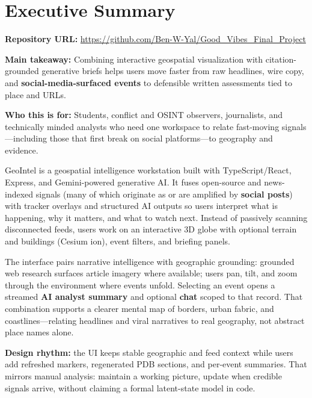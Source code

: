 \section*{Executive Summary}

\textbf{Repository URL:} \url{https://github.com/Ben-W-Yal/Good_Vibes_Final_Project}

\textbf{Main takeaway:} Combining interactive geospatial visualization with citation-grounded generative briefs helps users move faster from raw headlines, wire copy, and \textbf{social-media-surfaced events} to defensible written assessments tied to place and URLs.

\textbf{Who this is for:} Students, conflict and OSINT observers, journalists, and technically minded analysts who need one workspace to relate fast-moving signals---including those that first break on social platforms---to geography and evidence.

GeoIntel is a geospatial intelligence workstation built with TypeScript/React, Express, and Gemini-powered generative AI. It fuses open-source and news-indexed signals (many of which originate as or are amplified by \textbf{social posts}) with tracker overlays and structured AI outputs so users interpret what is happening, why it matters, and what to watch next. Instead of passively scanning disconnected feeds, users work on an interactive 3D globe with optional terrain and buildings (Cesium ion), event filters, and briefing panels.

The interface pairs narrative intelligence with geographic grounding: grounded web research surfaces article imagery where available; users pan, tilt, and zoom through the environment where events unfold. Selecting an event opens a streamed \textbf{AI analyst summary} and optional \textbf{chat} scoped to that record. That combination supports a clearer mental map of borders, urban fabric, and coastlines---relating headlines and viral narratives to real geography, not abstract place names alone.

\textbf{Design rhythm:} the UI keeps stable geographic and feed context while users add refreshed markers, regenerated PDB sections, and per-event summaries. That mirrors manual analysis: maintain a working picture, update when credible signals arrive, without claiming a formal latent-state model in code.
